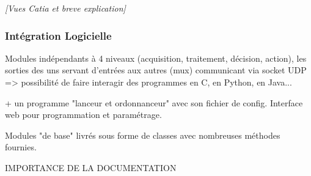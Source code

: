 			\textit{[Vues Catia et breve explication]}

	\subsubsection{Intégration Logicielle}\label{integrationLogicielle}

\begin{itshape}
Modules indépendants à 4 niveaux (acquisition, traitement, décision, action), les sorties des uns servant d'entrées aux autres (mux) communicant via socket UDP => possibilité de faire interagir des programmes en C, en Python, en Java... 

+ un programme "lanceur et ordonnanceur" avec son fichier de config. Interface web pour programmation et paramétrage.

Modules "de base" livrés sous forme de classes avec nombreuses méthodes fournies.

IMPORTANCE DE LA DOCUMENTATION

\end{itshape}